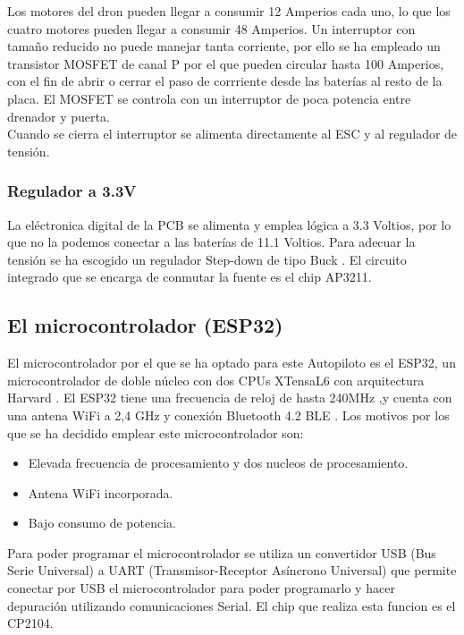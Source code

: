 Los motores del dron pueden llegar a consumir 12 Amperios cada uno, lo que los cuatro motores pueden llegar a consumir 48 Amperios. Un interruptor con tamaño reducido no puede manejar tanta corriente, por ello se ha empleado un transistor MOSFET de canal P por el que pueden circular hasta 100 Amperios, con el fin de abrir o cerrar el paso de corrriente desde las baterías al resto de la placa. El MOSFET se controla con un interruptor de poca potencia entre drenador y puerta.\\

Cuando se cierra el interruptor se alimenta directamente al ESC y al regulador de tensión.


\subsubsection{Regulador a 3.3V}

La eléctronica digital de la PCB se alimenta y emplea lógica a 3.3 Voltios, por lo que no la podemos conectar a las baterías de 11.1 Voltios.  Para adecuar la tensión se ha escogido un regulador Step-down de tipo Buck . El circuito integrado que se encarga de conmutar la fuente es el chip AP3211.


\subsection{El microcontrolador (ESP32)}

El microcontrolador por el que se ha optado para este Autopiloto es el ESP32, un microcontrolador de doble núcleo con dos CPUs XTensaL6 con arquitectura Harvard \cite{ESP32TechnicalReference}. El ESP32 tiene una frecuencia de reloj de hasta 240MHz ,y cuenta con una antena WiFi a 2,4 GHz y conexión Bluetooth 4.2 BLE \cite{ESP32DataSheet}. Los motivos por los que se ha decidido emplear este microcontrolador son:
\begin{itemize}
	\item Elevada frecuencia de procesamiento y dos nucleos de procesamiento.
	\item Antena WiFi incorporada.
	\item Bajo consumo de potencia.
\end{itemize}

\par Para poder programar el microcontrolador se utiliza un convertidor USB (Bus Serie Universal) a UART (Transmisor-Receptor Asíncrono Universal) que permite conectar por USB el microcontrolador para poder programarlo y hacer depuración utilizando comunicaciones Serial. El chip que realiza esta funcion es el CP2104.

